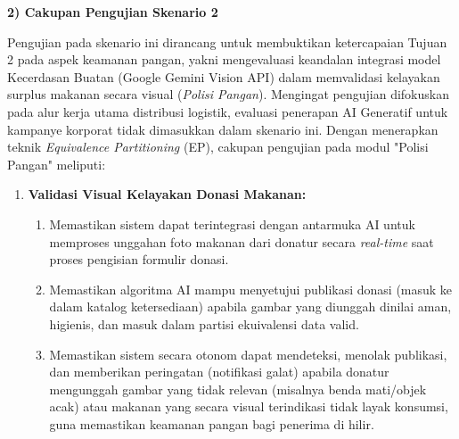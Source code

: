 \textbf{2) Cakupan Pengujian Skenario 2}

Pengujian pada skenario ini dirancang untuk membuktikan ketercapaian Tujuan 2 pada aspek keamanan pangan, yakni mengevaluasi keandalan integrasi model Kecerdasan Buatan (Google Gemini Vision API) dalam memvalidasi kelayakan surplus makanan secara visual (\textit{Polisi Pangan}). Mengingat pengujian difokuskan pada alur kerja utama distribusi logistik, evaluasi penerapan AI Generatif untuk kampanye korporat tidak dimasukkan dalam skenario ini. Dengan menerapkan teknik \textit{Equivalence Partitioning} (EP), cakupan pengujian pada modul "Polisi Pangan" meliputi:

\begin{enumerate}[label=\arabic*.]
    \item \textbf{Validasi Visual Kelayakan Donasi Makanan:}
    \begin{enumerate}[label=\alph*.]
        \item Memastikan sistem dapat terintegrasi dengan antarmuka AI untuk memproses unggahan foto makanan dari donatur secara \textit{real-time} saat proses pengisian formulir donasi.
        \item Memastikan algoritma AI mampu menyetujui publikasi donasi (masuk ke dalam katalog ketersediaan) apabila gambar yang diunggah dinilai aman, higienis, dan masuk dalam partisi ekuivalensi data valid.
        \item Memastikan sistem secara otonom dapat mendeteksi, menolak publikasi, dan memberikan peringatan (notifikasi galat) apabila donatur mengunggah gambar yang tidak relevan (misalnya benda mati/objek acak) atau makanan yang secara visual terindikasi tidak layak konsumsi, guna memastikan keamanan pangan bagi penerima di hilir.
    \end{enumerate}
\end{enumerate}


